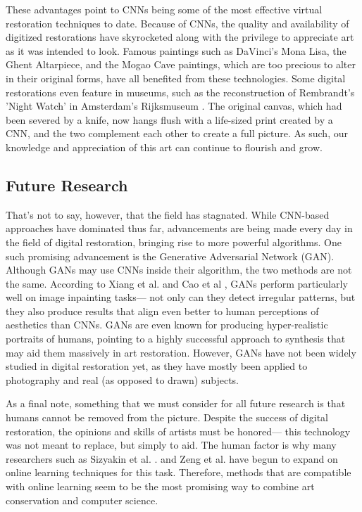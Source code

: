 \documentclass[a4paper,11pt]{article}
\begin{document}
These advantages point to CNNs being some of the most effective virtual restoration techniques to date. Because of CNNs, the quality and availability of digitized restorations have skyrocketed along with the privilege to appreciate art as it was intended to look. Famous paintings such as DaVinci's Mona Lisa, the Ghent Altarpiece, and the Mogao Cave paintings, which are too precious to alter in their original forms, have all benefited from these technologies. Some digital restorations even feature in museums, such as the reconstruction of Rembrandt's 'Night Watch' in Amsterdam's Rijksmuseum \cite{rembrandt}. The original canvas, which had been severed by a knife, now hangs flush with a life-sized print created by a CNN, and the two complement each other to create a full picture. As such, our knowledge and appreciation of this art can continue to flourish and grow. 

\subsection{Future Research}

That’s not to say, however, that the field has stagnated. While CNN-based approaches have dominated thus far, advancements are being made every day in the field of digital restoration, bringing rise to more powerful algorithms. One such promising advancement is the Generative Adversarial Network (GAN). Although GANs may use CNNs inside their algorithm, the two methods are not the same. According to Xiang et al. \cite{xiang} and Cao et al \cite{cao}, GANs perform particularly well on image inpainting tasks— not only can they detect irregular patterns, but they also produce results that align even better to human perceptions of aesthetics than CNNs. GANs are even known for producing hyper-realistic portraits of humans, pointing to a highly successful approach to synthesis \cite{karras} that may aid them massively in art restoration. However, GANs have not been widely studied in digital restoration yet, as they have mostly been applied to photography and real (as opposed to drawn) subjects.

As a final note, something that we must consider for all future research is that humans cannot be removed from the picture. Despite the success of digital restoration, the opinions and skills of artists must be honored— this technology was not meant to replace, but simply to aid. The human factor is why many researchers such as Sizyakin et al. \cite{sizyakin}. and Zeng et al. \cite{zenggongzeng} have begun to expand on online learning techniques for this task. Therefore, methods that are compatible with online learning seem to be the most promising way to combine art conservation and computer science.







\small
\end{document}
